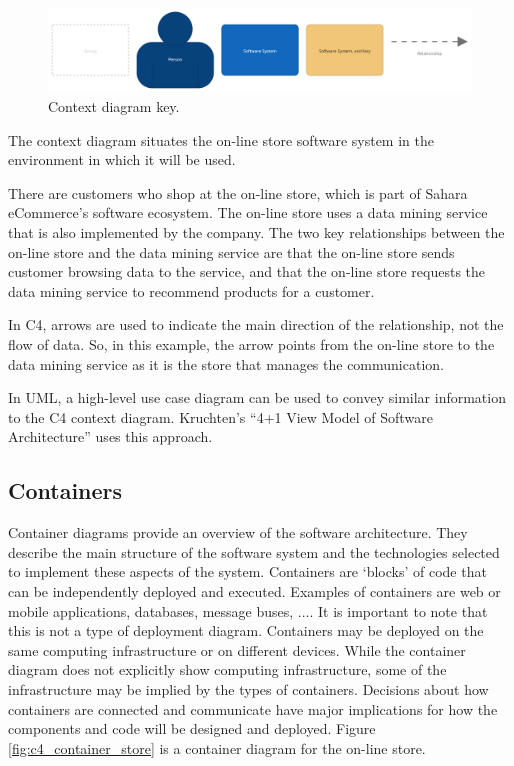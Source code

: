 \begin{figure}[h!]
    \centering
    \begin{adjustwidth}{-7.5mm}{-7.5mm}
        \includegraphics[trim=20 15 20 15,clip,width=0.95\paperwidth]{images/c4/context_diagram-key.png}
    \end{adjustwidth}
    \caption{Context diagram key.}
    \label{fig:c4_context_key}
\end{figure}

\noindent
The context diagram situates the on-line store software system in the environment in which it will be used.

There are customers who shop at the on-line store, which is part of Sahara eCommerce's software ecosystem.
The on-line store uses a data mining service that is also implemented by the company.
The two key relationships between the on-line store and the data mining service are 
that the on-line store sends customer browsing data to the service,
and that the on-line store requests the data mining service to recommend products for a customer.

In C4, arrows are used to indicate the main direction of the relationship, not the flow of data.
So, in this example, the arrow points from the on-line store to the data mining service as it is the store that manages the communication.

In UML, a high-level use case diagram can be used to convey similar information to the C4 context diagram.
Kruchten's ``4+1 View Model of Software Architecture'' \cite{4+1-model} uses this approach.

\subsection{Containers}
Container diagrams provide an overview of the software architecture.
They describe the main structure of the software system and the technologies selected to implement these aspects of the system.
Containers are `blocks' of code that can be independently deployed and executed.
Examples of containers are web or mobile applications, databases, message buses, ....
It is important to note that this is not a type of deployment diagram.
Containers may be deployed on the same computing infrastructure or on different devices.
While the container diagram does not explicitly show computing infrastructure, some of the infrastructure may be implied by the types of containers.
Decisions about how containers are connected and communicate have major implications for how the components and code will be designed and deployed.
Figure \ref{fig:c4_container_store} is a container diagram for the on-line store.

